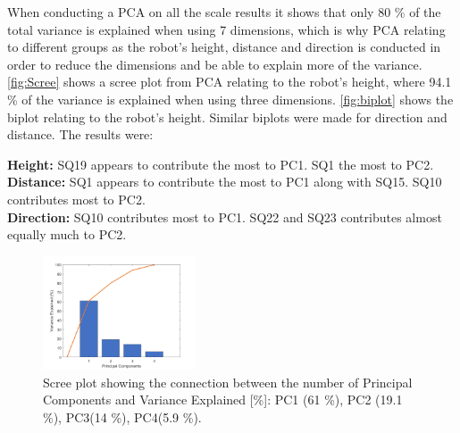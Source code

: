 \noindent
When conducting a PCA on all the scale results it shows that only 80 \% of the total variance is explained when using 7 dimensions, which is why PCA relating to different groups as the robot's height, distance and direction is conducted in order to reduce the dimensions and be able to explain more of the variance. \autoref{fig:Scree} shows a scree plot from PCA relating to the robot's height, where 94.1 \% of the variance is explained when using three dimensions. \autoref{fig:biplot} shows the biplot relating to the robot's height. Similar biplots were made for direction and distance. The results were:

\noindent
\textbullet \textbf{Height:} SQ19 appears to contribute the most to PC1. SQ1 the most to PC2. \\
\textbullet \textbf{Distance:} SQ1 appears to contribute the most to PC1 along with SQ15. SQ10 contributes most to PC2.\\
\textbullet \textbf{Direction:} SQ10 contributes most to PC1. SQ22 and SQ23 contributes almost equally much to PC2.\\
%
\begin{figure}
	\centering
	\includegraphics[width = 0.40\textwidth]{Figure/Scree.png}
	\setlength{} 
	\caption{Scree plot showing the connection between the number of Principal Components and Variance Explained [\%]: PC1 (61 \%), PC2 (19.1 \%), PC3(14 \%), PC4(5.9 \%).}
	\label{fig:Scree}
\end{figure}
\noindent

